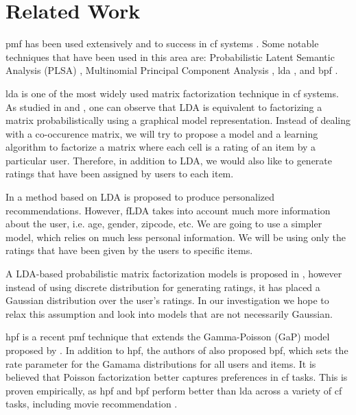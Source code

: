 \documentclass{article} %
\begin{document}
\section{Related Work}

\Gls{pmf} has been used extensively and to success in \gls{cf} systems \cite{koren2009matrix}. Some notable techniques that have been used in this area are: Probabilistic Latent Semantic Analysis (PLSA) \cite{hofmann1999probabilistic}, Multinomial Principal Component Analysis \cite{buntine2002variational}, \acrfull{lda} \cite{lda}, and \acrfull{bpf} \cite{gopalan2013scalable}.

\Gls{lda} is one of the most widely used matrix factorization technique in
\gls{cf} systems. As studied in \cite{lda} and \cite{discrete-pca},
one can observe that LDA is equivalent to factorizing a matrix
probabilistically using a graphical model representation. Instead of dealing with a co-occurence matrix, we will try to propose a model and
a learning algorithm to factorize a matrix where each cell is a rating of an item
by a particular user. Therefore, in addition to LDA, we would also like to generate
ratings that have been assigned by users to each item. 

In \cite{Argwal-fDLA} a method based on LDA is proposed to produce personalized recommendations.
However, fLDA takes into account much more information about the user, i.e. age, 
gender, zipcode, etc. We are going to use a simpler model, which relies on
much less personal information. We will be using only the ratings 
that have been given by the users to specific items.

A LDA-based probabilistic matrix factorization models is proposed in
\cite{conf/icdm/ShanB10}, however instead of using discrete distribution
for generating ratings, it has placed a Gaussian distribution over the user's
ratings. In our investigation we hope to relax this assumption and look into
models that are not necessarily Gaussian.

\acrfull{hpf} \cite{gopalan2013scalable} is a recent \gls{pmf} technique that
extends the Gamma-Poisson (GaP) model proposed by \cite{canny2004gap}.
In addition to \gls{hpf}, the authors of \cite{gopalan2013scalable} also
proposed \gls{bpf}, which sets the rate parameter for the Gamama distributions for
all users and items. It is believed that Poisson factorization better captures
preferences in \gls{cf} tasks. This is proven empirically, as \gls{hpf} and \gls{bpf} perform better than \gls{lda} across a variety of \gls{cf} tasks, including movie recommendation \cite{gopalan2013scalable}.
\end{document}
